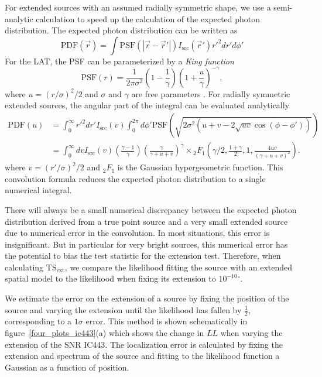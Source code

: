 \documentclass[12pt,preprint]{aastex}
\newcommand{\tsext}{{\ensuremath{\text{TS}_{\text{ext}}}}\xspace}
\newcommand{\loglikelihood}{\ensuremath{LL}\xspace}
\renewcommand{\deg}{\ensuremath{^\circ}\xspace}
\begin{document}
For extended sources with an assumed radially symmetric shape,
we use a semi-analytic calculation to speed up the calculation of
the expected photon distribution. The expected photon 
distribution can be written as
\begin{equation}
  \text{PDF}(\vec r) = \int  \text{PSF}(|\vec r - \vec r'|)I_\text{src}(\vec r') r'^2 dr' d\phi'
\end{equation}
For the LAT, the PSF can be parameterized by a {\em King function}
\begin{equation}
  \text{PSF}(r) = 
  \frac{1}{2\pi\sigma^2}
  \left(1-\frac{1}{\gamma}\right)
  \left(1+\frac{u}{\gamma}\right)^{-\gamma},
\end{equation}
where $u=(r/\sigma)^2/2$ and $\sigma$ and $\gamma$ are free parameters
\citep{matthew_kerr_thesis}.  For radially symmetric extended sources,
the angular part of the integral can be evaluated analytically
\begin{align}
  \text{PDF}(u) & = \int_0^\infty r'^2 dr'
  I_\text{src}(v) 
  \int_0^{2\pi} d\phi' 
  \text{PSF}(\sqrt{2\sigma^2(u+v-2\sqrt{uv}\cos(\phi-\phi'))})
  \\
  & = \int_0^\infty dv
  I_\text{src}(v) 
  \left(\frac{\gamma-1}{\gamma}\right)
  \left( \frac{\gamma}{\gamma + u + v}\right)^\gamma 
  \times {}_2F_1 \left(\gamma/2,\frac{1+\gamma}{2},1,\frac{4uv}{(\gamma+u+v)^2}\right).
\end{align}
where $v=(r'/\sigma)^2/2$ and ${}_2F_1$ is the Gaussian hypergeometric
function.  This convolution formula reduces the expected photon
distribution to a single numerical integral.

There will always be a small numerical discrepancy between the expected
photon distribution derived from a true point source and a very small
extended source due to numerical error in the convolution.  In most
situations, this error is insignificant.  But in particular for
very bright sources, this numerical error has the potential to bias the
test statistic for the extension test. Therefore, when calculating
\tsext, we compare the likelihood fitting the source with an extended
spatial model to the likelihood when fixing its extension to ${10^{-10}}\deg$.

We estimate the error on the extension of a source by fixing the position
of the source and varying the extension until the likelihood has fallen
by $\tfrac{1}{2}$, corresponding to a $1\sigma$ error.  This method is
shown schematically in figure~\ref{four_plots_ic443}(a) which shows the
change in \loglikelihood when varying the extension of the SNR IC443.
The localization error is calculated by fixing the extension and spectrum
of the source and fitting to the likelihood function a Gaussian as a function
of position.
\end{document}
